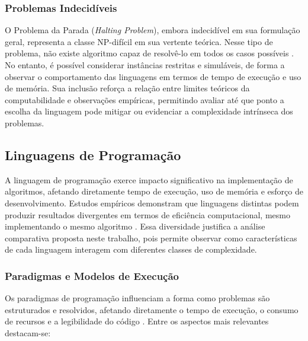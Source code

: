 \documentclass[12pt,a4paper]{article}
\newcommand{\eng}[1]{\textit{#1}}
\begin{document}
\subsubsection{Problemas Indecidíveis}
O Problema da Parada (\eng{Halting Problem}), embora indecidível em sua formulação geral, representa a classe NP-difícil em sua vertente teórica. Nesse tipo de problema, não existe algoritmo capaz de resolvê-lo em todos os casos possíveis \cite{sipser2012}. No entanto, é possível considerar instâncias restritas e simuláveis, de forma a observar o comportamento das linguagens em termos de tempo de execução e uso de memória. Sua inclusão reforça a relação entre limites teóricos da computabilidade e observações empíricas, permitindo avaliar até que ponto a escolha da linguagem pode mitigar ou evidenciar a complexidade intrínseca dos problemas.

\subsection{Linguagens de Programação}
A linguagem de programação exerce impacto significativo na implementação de algoritmos, afetando diretamente tempo de execução, uso de memória e esforço de desenvolvimento. Estudos empíricos demonstram que linguagens distintas podem produzir resultados divergentes em termos de eficiência computacional, mesmo implementando o mesmo algoritmo \cite{prechelt2000, nanz2015, ray2017}. Essa diversidade justifica a análise comparativa proposta neste trabalho, pois permite observar como características de cada linguagem interagem com diferentes classes de complexidade.

\subsubsection{Paradigmas e Modelos de Execução}
Os paradigmas de programação influenciam a forma como problemas são estruturados e resolvidos, afetando diretamente o tempo de execução, o consumo de recursos e a legibilidade do código . Entre os aspectos mais relevantes destacam-se:
\end{document}

